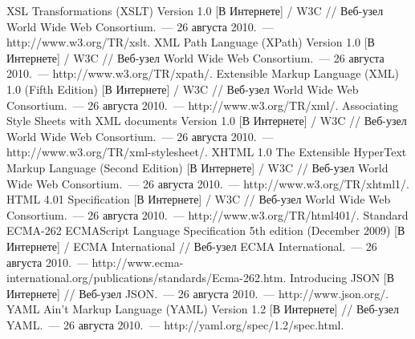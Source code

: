 \documentclass[a4paper,14pt,oneside]{extreport}
\begin{document}
\begin{thebibliography}{99}
 XSL Transformations (XSLT) Version 1.0 [В Интернете] / W3C // Веб-узел World Wide Web Consortium.~--- 26 августа 2010.~--- http://www.w3.org/TR/xslt.
 XML Path Language (XPath) Version 1.0 [В Интернете] / W3C // Веб-узел World Wide Web Consortium.~--- 26 августа 2010.~--- http://www.w3.org/TR/xpath/.
 Extensible Markup Language (XML) 1.0 (Fifth Edition) [В Интернете] / W3C // Веб-узел World Wide Web Consortium.~--- 26 августа 2010.~--- http://www.w3.org/TR/xml/.
 Associating Style Sheets with XML documents Version 1.0 [В Интернете] / W3C // Веб-узел World Wide Web Consortium.~--- 26 августа 2010.~--- http://www.w3.org/TR/xml-stylesheet/.
 XHTML 1.0 The Extensible HyperText Markup Language (Second Edition) [В Интернете] / W3C // Веб-узел World Wide Web Consortium.~--- 26 августа 2010.~--- http://www.w3.org/TR/xhtml1/.
 HTML 4.01 Specification [В Интернете] / W3C // Веб-узел World Wide Web Consortium.~--- 26 августа 2010.~--- http://www.w3.org/TR/html401/.
 Standard ECMA-262 ECMAScript Language Specification 5th edition (December 2009) [В Интернете] / ECMA International // Веб-узел ECMA International.~--- 26 августа 2010.~--- http://www.ecma-international.org/publications/standards/Ecma-262.htm.
 Introducing JSON  [В Интернете] // Веб-узел JSON.~--- 26 августа 2010.~--- http://www.json.org/.
 YAML Ain’t Markup Language (YAML) Version 1.2  [В Интернете] // Веб-узел YAML.~--- 26 августа 2010.~--- http://yaml.org/spec/1.2/spec.html.

\end{thebibliography}
\end{document}
